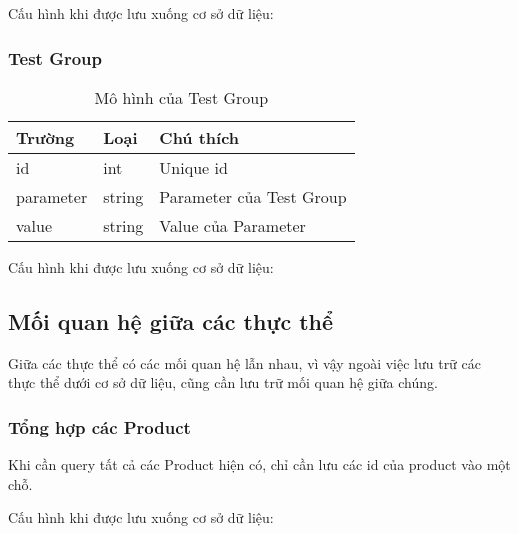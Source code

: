Cấu hình khi được lưu xuống cơ sở dữ liệu:

\begin{itemize}
\end{itemize}

\subsubsection{Test Group}

\begin{table}[H]
	\centering
	\begin{tabular}{|l|l|l|}
		\hline
		Trường    & Loại   & Chú thích                \\ \hline
		id        & int    & Unique id                \\ \hline
		parameter & string & Parameter của Test Group \\ \hline
		value     & string & Value của Parameter      \\ \hline
	\end{tabular}
	\caption{Mô hình của Test Group}
\end{table}

Cấu hình khi được lưu xuống cơ sở dữ liệu:

\begin{itemize}
\end{itemize}

\subsection{Mối quan hệ giữa các thực thể}

Giữa các thực thể có các mối quan hệ lẫn nhau, vì vậy ngoài việc lưu trữ các thực thể dưới
cơ sở dữ liệu, cũng cần lưu trữ mối quan hệ giữa chúng.

\subsubsection{Tổng hợp các Product}

Khi cần query tất cả các Product hiện có, chỉ cần lưu các id của product vào một chỗ.

Cấu hình khi được lưu xuống cơ sở dữ liệu:

\begin{itemize}
\end{itemize}

